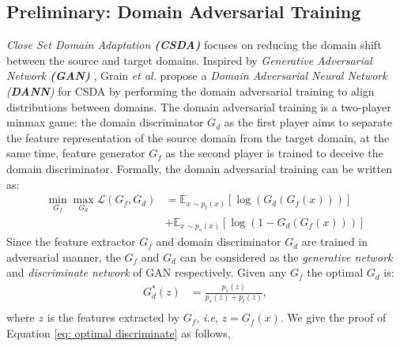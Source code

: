 \subsection{Preliminary: Domain Adversarial Training}
\textit{Close Set Domain Adaptation \textbf{(CSDA)}} focuses on reducing the domain shift between the source and target domains.
Inspired by \textit{Generative Adversarial Network \textbf{(GAN)}} \cite{goodfellow2014generative}, Grain \textit{et al.} propose a \textit{Domain Adversarial Neural Network (\textbf{DANN})} \cite{DomainAdversrialNetwork} for CSDA by performing the domain adversarial training to align distributions between domains.
The domain adversarial training is a two-player minmax game: 
the domain discriminator $G_d$ as the first player aims to separate the feature representation of the source domain from the target domain, at the same time, feature generator $G_f$ as the second player is trained to deceive the domain discriminator. 
Formally, the domain adversarial training can be written as:
\begin{equation}
    \label{eq: training DANN}
    \begin{split}
        \min_{G_f} \max_{G_d} \mathscr{L}(G_f,G_d) &=\mathbb{E}_{x\sim p_t(x)} \left[ \log \left(G_d\left(G_f\left(x\right)\right)\right) \right]\\
        &+\mathbb{E}_{x\sim p_s(x)}\left[ \log \left(1-G_d\left(G_f\left(x\right)\right)\right) \right]
    \end{split}
\end{equation}
Since the feature extractor $G_f$ and domain discriminator $G_d$ are trained in adversarial manner, the $G_f$ and $G_d$ can be considered as the \textit{generative network} and \textit{discriminate network} of GAN respectively. 
Given any $G_f$ the optimal $G_d$ is:
\begin{equation}
    \label{eq: optimal discriminate}
    \begin{split}
        G_d^*(z) &= \frac{p_s(z)}{p_s(z)+p_t(z)}, \\
    \end{split}
\end{equation}
where $z$ is the features extracted by $G_f$, \textit{i.e}, $z=G_f(x)$.
We give the proof of Equation \ref{eq: optimal discriminate} as follows, 

